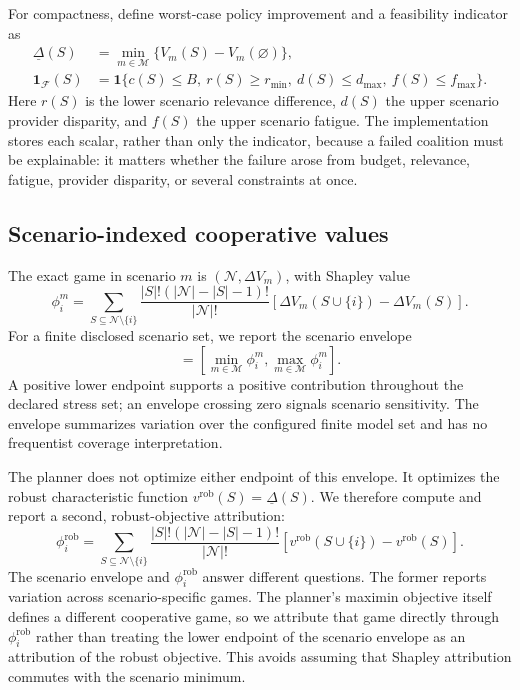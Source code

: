 \documentclass[review]{elsarticle}
\theoremstyle{plain}
\theoremstyle{definition}
\theoremstyle{remark}
\newcommand{\Players}{\mathcal{N}}
\newcommand{\Models}{\mathcal{M}}
\newcommand{\Utility}{V}
\newcommand{\Shap}{\phi}
\begin{document}
For compactness, define worst-case policy improvement and a feasibility indicator as
\begin{equation}
 \begin{aligned}
 \underline{\Delta}(S)
   &=\min_{m\in\Models}\{\Utility_m(S)-\Utility_m(\varnothing)\},\\
 \mathbf{1}_{\mathcal F}(S)
   &=\mathbf{1}\{c(S)\leq B,\ r(S)\geq r_{\min},\
      d(S)\leq d_{\max},\ f(S)\leq f_{\max}\}.
 \end{aligned}
\label{eq:robust-feasibility}
\end{equation}
Here $r(S)$ is the lower scenario relevance difference, $d(S)$ the upper scenario provider disparity, and $f(S)$ the upper scenario fatigue. The implementation stores each scalar, rather than only the indicator, because a failed coalition must be explainable: it matters whether the failure arose from budget, relevance, fatigue, provider disparity, or several constraints at once.

\subsection{Scenario-indexed cooperative values}

The exact game in scenario $m$ is $(\Players,\Delta\Utility_m)$, with Shapley value
\begin{equation}
 \Shap_i^m=\sum_{S\subseteq\Players\setminus\{i\}}\frac{|S|!(|\Players|-|S|-1)!}{|\Players|!}\left[\Delta\Utility_m(S\cup\{i\})-\Delta\Utility_m(S)\right].
\label{eq:shapley}
\end{equation}
For a finite disclosed scenario set, we report the scenario envelope
\begin{equation}
 [\underline{\Shap}_i,\overline{\Shap}_i]=\left[\min_{m\in\Models}\Shap_i^m,\max_{m\in\Models}\Shap_i^m\right].
\label{eq:region}
\end{equation}
A positive lower endpoint supports a positive contribution throughout the declared stress set; an envelope crossing zero signals scenario sensitivity. The envelope summarizes variation over the configured finite model set and has no frequentist coverage interpretation.

The planner does not optimize either endpoint of this envelope. It optimizes the robust characteristic function $v^{\mathrm{rob}}(S)=\underline{\Delta}(S)$. We therefore compute and report a second, robust-objective attribution:
\begin{equation}
 \phi_i^{\mathrm{rob}}=\sum_{S\subseteq\Players\setminus\{i\}}\frac{|S|!(|\Players|-|S|-1)!}{|\Players|!}\left[v^{\mathrm{rob}}(S\cup\{i\})-v^{\mathrm{rob}}(S)\right].
\label{eq:robust-shapley}
\end{equation}
The scenario envelope and $\phi_i^{\mathrm{rob}}$ answer different questions. The former reports variation across scenario-specific games. The planner's maximin objective itself defines a different cooperative game, so we attribute that game directly through $\phi_i^{\mathrm{rob}}$ rather than treating the lower endpoint of the scenario envelope as an attribution of the robust objective. This avoids assuming that Shapley attribution commutes with the scenario minimum.
\end{document}
